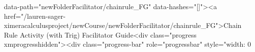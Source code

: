 data-path="newFolderFacilitator/chainrule_FG" data-hashes="[]"><a href="/lauren-sager-ximeracalculusproject/newCourse/newFolderFacilitator/chainrule_FG">Chain Rule Activity (with Trig) Facilitator Guide<div class="progress xmprogresshidden"><div class="progress-bar" role="progressbar" style="width: 0%